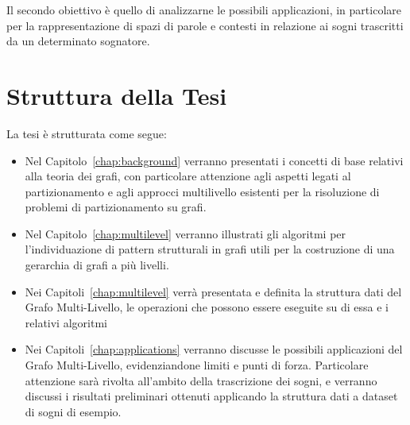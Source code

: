 Il secondo obiettivo \`e quello di analizzarne le possibili applicazioni, in particolare per la
rappresentazione di spazi di parole e contesti in relazione ai sogni trascritti da un determinato sognatore. \newline

\section{Struttura della Tesi}

La tesi \`e strutturata come segue:
\begin{itemize}
    \item Nel Capitolo~\ref{chap:background} verranno presentati i concetti di base relativi alla teoria dei grafi,
    con particolare attenzione agli aspetti legati al partizionamento e agli approcci multilivello esistenti per la
    risoluzione di problemi di partizionamento su grafi.
    \item Nel Capitolo~\ref{chap:multilevel} verranno illustrati gli algoritmi per l'individuazione di pattern
    strutturali in grafi utili per la costruzione di una gerarchia di grafi a pi\`u livelli.
    \item Nei Capitoli~\ref{chap:multilevel} verr\`a presentata e definita la struttura dati del Grafo Multi-Livello,
    le operazioni che possono essere eseguite su di essa e i relativi algoritmi
    \item Nei Capitoli~\ref{chap:applications} verranno discusse le possibili applicazioni del Grafo Multi-Livello,
    evidenziandone limiti e punti di forza.
    Particolare attenzione sar\`a rivolta all'ambito della trascrizione dei sogni, e verranno discussi i risultati
    preliminari ottenuti applicando la struttura dati a dataset di sogni di esempio.
\end{itemize}